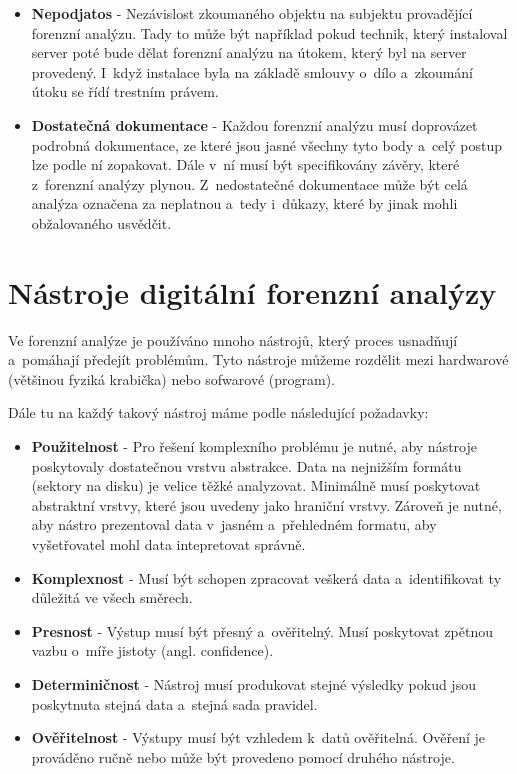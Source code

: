\documentclass[thesis=B,czech]{FITthesis}[2012/06/26]
\begin{document}
\begin{itemize}
\item \textbf{Nepodjatos} - Nezávislost zkoumaného objektu na subjektu provadějící forenzní analýzu. Tady to může být například pokud technik, který instaloval server poté bude dělat forenzní analýzu na útokem, který byl na server provedený. I~když instalace byla na základě smlouvy o~dílo a~zkoumání útoku se řídí trestním právem. 

\item \textbf{Dostatečná dokumentace} - Každou forenzní analýzu musí doprovázet podrobná dokumentace, ze které jsou jasné všechny tyto body a~celý postup lze podle ní zopakovat. Dále v~ní musí být specifikovány závěry, které z~forenzní analýzy plynou. Z~nedostatečné dokumentace může být celá analýza označena za neplatnou a~tedy i~důkazy, které by jinak mohli obžalovaného usvědčit.

\end{itemize}


\chapter{Nástroje digitální forenzní analýzy} 
\label{body}
Ve forenzní analýze je používáno mnoho nástrojů, který proces usnadňují a~pomáhají předejít problémům. Tyto nástroje můžeme rozdělit mezi hardwarové (většinou fyziká krabička) nebo sofwarové (program).

Dále tu na každý takový nástroj máme podle \cite{for_need} následující požadavky:

\begin{itemize}
\item \textbf{Použitelnost} - Pro řešení komplexního problému je nutné, aby nástroje poskytovaly dostatečnou vrstvu abstrakce. Data na nejnižším formátu (sektory na disku) je velice těžké analyzovat. Minimálně musí poskytovat abstraktní vrstvy, které jsou uvedeny jako hraniční vrstvy. Zároveň je nutné, aby nástro prezentoval data v~jasném a~přehledném formatu, aby vyšetřovatel mohl data intepretovat správně. \cite{carrier2003defining}
\item \textbf{Komplexnost} - Musí být schopen zpracovat veškerá data a~identifikovat ty důležitá ve všech směrech.
\item \textbf{Presnost} - Výstup musí být přesný a~ověřitelný. Musí poskytovat zpětnou vazbu o~míře jistoty (angl. confidence).
\item \textbf{Determiničnost} - Nástroj musí produkovat stejné výsledky pokud jsou poskytnuta stejná data a~stejná sada pravidel.
\item \textbf{Ověřitelnost} - Výstupy musí být vzhledem k~datů ověřitelná. Ověření je prováděno ručně nebo může být provedeno pomocí druhého nástroje.
\end{itemize}
\end{document}
